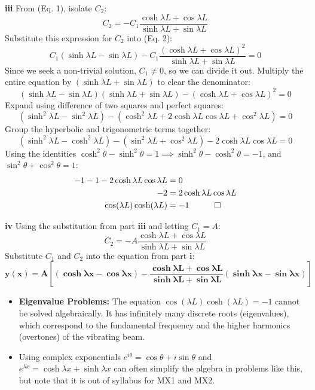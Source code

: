 \begin{solution}
\vspace{0.3cm}
\textbf{iii} From (Eq. 1), isolate $C_2$:
\[ C_2 = -C_1 \frac{\cosh \lambda L + \cos \lambda L}{\sinh \lambda L + \sin \lambda L} \]
Substitute this expression for $C_2$ into (Eq. 2):
\[ C_1(\sinh \lambda L - \sin \lambda L) - C_1 \frac{(\cosh \lambda L + \cos \lambda L)^2}{\sinh \lambda L + \sin \lambda L} = 0 \]
Since we seek a non-trivial solution, $C_1 \neq 0$, so we can divide it out. Multiply the entire equation by $(\sinh \lambda L + \sin \lambda L)$ to clear the denominator:
\[ (\sinh \lambda L - \sin \lambda L)(\sinh \lambda L + \sin \lambda L) - (\cosh \lambda L + \cos \lambda L)^2 = 0 \]
Expand using difference of two squares and perfect squares:
\[ (\sinh^2 \lambda L - \sin^2 \lambda L) - (\cosh^2 \lambda L + 2\cosh \lambda L \cos \lambda L + \cos^2 \lambda L) = 0 \]
Group the hyperbolic and trigonometric terms together:
\[ (\sinh^2 \lambda L - \cosh^2 \lambda L) - (\sin^2 \lambda L + \cos^2 \lambda L) - 2\cosh \lambda L \cos \lambda L = 0 \]
Using the identities $\cosh^2 \theta - \sinh^2 \theta = 1 \implies \sinh^2 \theta - \cosh^2 \theta = -1$, and $\sin^2 \theta + \cos^2 \theta = 1$:
\begin{align*}
    -1 - 1 - 2\cosh \lambda L \cos \lambda L &= 0 \\
    -2 &= 2\cosh \lambda L \cos \lambda L \\
    \cos(\lambda L)\cosh(\lambda L) &= -1 \quad \qed
\end{align*}

\vspace{0.3cm}
\textbf{iv} Using the substitution from part \textbf{iii} and letting $C_1 = A$:
\[ C_2 = -A \frac{\cosh \lambda L + \cos \lambda L}{\sinh \lambda L + \sin \lambda L} \]
Substitute $C_1$ and $C_2$ into the equation from part \textbf{i}:
\[ \mathbf{y(x) = A \left[ (\cosh \lambda x - \cos \lambda x) - \frac{\cosh \lambda L + \cos \lambda L}{\sinh \lambda L + \sin \lambda L} (\sinh \lambda x - \sin \lambda x) \right]} \]
\end{solution}

\begin{takeaways}
\begin{itemize}[leftmargin=*]
    \item \textbf{Eigenvalue Problems:} The equation $\cos(\lambda L)\cosh(\lambda L) = -1$ cannot be solved algebraically. It has infinitely many discrete roots (eigenvalues), which correspond to the fundamental frequency and the higher harmonics (overtones) of the vibrating beam. 
    \item Using complex exponentials $e^{i\theta} = \cos \theta + i \sin \theta$ and $e^{\lambda x} = \cosh \lambda x + \sinh \lambda x$ can often simplify the algebra in problems like this, but note that it is out of syllabus for MX1 and MX2.
\end{itemize}
\end{takeaways}

